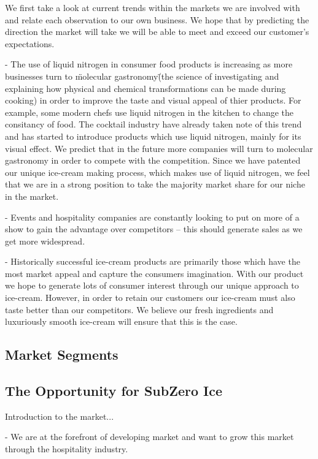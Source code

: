 \documentclass{article}
\begin{document}
   We first take a look at current trends within the markets we are involved with and relate each observation to our own business. We hope that by predicting the direction the market will take we will be able to meet and exceed our customer's expectations.

 - The use of liquid nitrogen in consumer food products is increasing as more businesses turn to \"molecular gastronomy\" (the science of investigating and explaining how physical and chemical transformations can be made during cooking) in order to improve the taste and visual appeal of thier products. For example, some modern chefs use liquid nitrogen in the kitchen to change the consitancy of food. The cocktail industry have already taken note of this trend and has started to introduce products which use liquid nitrogen, mainly for its visual effect. We predict that in the future more companies will turn to molecular gastronomy in order to compete with the competition. Since we have patented our unique ice-cream making process, which makes use of liquid nitrogen, we feel that we are in a strong position to take the majority market share for our niche in the market. 


 - Events and hospitality companies are constantly looking to put on more of a show to gain the advantage over competitors – this should generate sales as we get more widespread.


 - Historically successful ice-cream products are primarily those
which have the most market appeal and capture the consumers
imagination. With our product we hope to generate lots of consumer
interest through our unique approach to ice-cream. However,
in order to retain our customers our ice-cream must also taste
better than our competitors. We believe our fresh ingredients and
luxuriously smooth ice-cream will ensure that this is the case.


  \subsection{Market Segments}


  \subsection{The Opportunity for SubZero Ice}
  Introduction to the market...

   - We are at the forefront of developing market and want to grow this
market through the hospitality industry.
\end{document}

